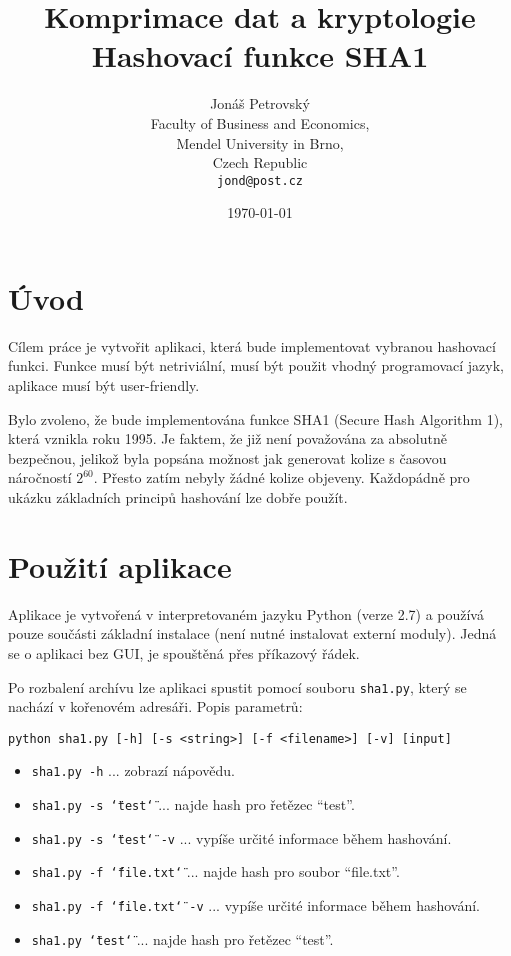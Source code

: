 \documentclass[a4paper]{article}
\begin{document}
\title{\vspace{-2.0cm}Komprimace dat a kryptologie \\ \textbf{Hashovací funkce SHA1}}
\author{Jonáš Petrovský\\
        Faculty of Business and Economics,\\
		Mendel University in Brno,\\
		Czech Republic \\
		\texttt{jond@post.cz}}
\date{\today}
\maketitle

\newcommand{\dqtt}[1]{\texttt{\char`\"}#1\texttt{\char`\"}}

\section{Úvod}
Cílem práce je vytvořit aplikaci, která bude implementovat vybranou hashovací funkci. Funkce musí být netriviální, musí být použit vhodný programovací jazyk, aplikace musí být user-friendly.

Bylo zvoleno, že bude implementována funkce SHA1 (Secure Hash Algorithm 1), která vznikla roku 1995. Je faktem, že již není považována za absolutně bezpečnou, jelikož byla popsána možnost jak generovat kolize s časovou náročností $2^{60}$. Přesto zatím nebyly žádné kolize objeveny. Každopádně pro ukázku základních principů hashování lze dobře použít.

\section{Použití aplikace}
Aplikace je vytvořená v interpretovaném jazyku Python (verze 2.7) a používá pouze součásti základní instalace (není nutné instalovat externí moduly). Jedná se o aplikaci bez GUI, je spouštěná přes příkazový řádek. 

Po rozbalení archívu lze aplikaci spustit pomocí souboru \texttt{sha1.py}, který se nachází v kořenovém adresáři. Popis parametrů:

\begin{verbatim}
python sha1.py [-h] [-s <string>] [-f <filename>] [-v] [input]
\end{verbatim}

\begin{itemize}
\item \texttt{sha1.py -h} ... zobrazí nápovědu.
\item \texttt{sha1.py -s \dqtt{test}} ... najde hash pro řetězec ``test''.
\item \texttt{sha1.py -s \dqtt{test} -v} ... vypíše určité informace během hashování.
\item \texttt{sha1.py -f  \dqtt{file.txt}} ... najde hash pro soubor ``file.txt''.
\item \texttt{sha1.py -f  \dqtt{file.txt} -v} ... vypíše určité informace během hashování.
\item \texttt{sha1.py \dqtt{test}} ... najde hash pro řetězec ``test''.
\end{itemize}
\end{document}
